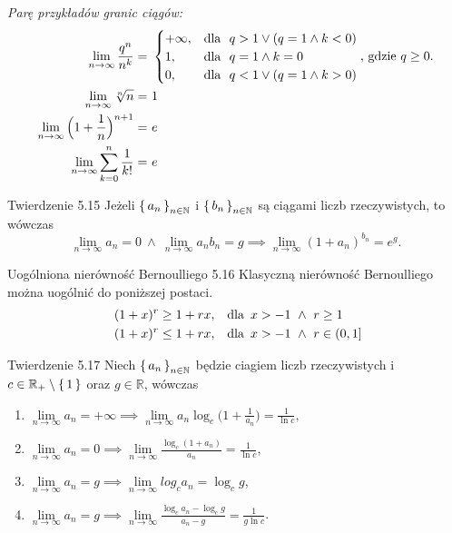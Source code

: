 \documentclass{article}
\newcommand{\hquad}{\mkern9mu}
\newcommand{\R}{\mathbb{R}}
\newcommand{\N}{\mathbb{N}}
\newcommand{\lin}[1]{\lim\limits_{n\to\infty}{#1}}
\newcommand{\seq}[1]{\set{#1_n}_{n\in\N}}
\begin{document}
\textit{Parę przykładów granic ciągów:}
\begin{align}
    \lin{\frac{q^n}{n^k}}=\ &
        \begin{cases}
            +\infty, &\text{dla }\ q>1 \lor(q=1\land k<0)\\
            1, &\text{dla }\ q=1\land k=0\\
            0, &\text{dla }\ q<1\lor(q=1\land k>0)
        \end{cases}\text{, gdzie }q\ge0.\\
    \lin{\sqrt[n]{n}}=\ &1\\
    \lin{\Bigl(1+\frac{1}{n} \Bigl)^{n+1}}=\ &e\\
    \lin{\sum_{k=0}^{n}\frac{1}{k!}}=\ &e
\end{align}\smallskip

\begin{twier}{Twierdzenie 5.15}
    Jeżeli $\seq{a}$ i $\seq{b}$ są ciągami liczb rzeczywistych, to wówczas
    \begin{equation*}
        \lin{a_n}=0\ \land\ \lin{a_n b_n}=g\implies \lin{(1+a_n)^{b_n}}=e^g.
    \end{equation*}
\end{twier}

\begin{twier}{Uogólniona nierówność Bernoulliego 5.16}
    Klasyczną nierówność Bernoulliego można uogólnić do poniższej postaci.
\begin{align*}
    (1+x)^r\ge1+rx,\quad&\text{dla}\hquad x>-1\ \land\ r\ge1\\\
    (1+x)^r\le1+rx,\quad&\text{dla}\hquad x>-1\ \land\ r\in(0,1]
\end{align*}
\end{twier}

\begin{twier}{Twierdzenie 5.17}
Niech $\seq{a}$ będzie ciagiem liczb rzeczywistych i $c\in\R_{+}\setminus\set{1}$ oraz $g\in\R$, wówczas
\begin{enumerate}[label=(\arabic*)]
    \item $\lin{a_n}=+\infty\implies\lin{a_n\log_{c}{\bigl(1+\frac{1}{a_n}\bigl)}}=\frac{1}{\ln{c}},$
    \item $\lin{a_n}=0\implies\lin{\frac{\log_c{(1+a_n)}}{a_n}}=\frac{1}{\ln{c}}$,
    \item $\lin{a_n}=g\implies\lin{log_{c}{a_n}}=\log_{c}{g}$,
    \item $\lin{a_n}=g\implies\lin{\frac{\log_{c}{a_n}-\log_{c}{g}}{a_n-g}}=\frac{1}{g\ln{c}}$.
\end{enumerate}
\end{twier}
\end{document}
